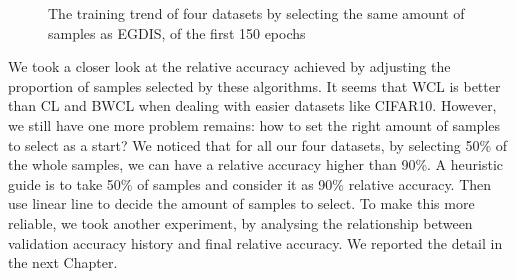 \begin{figure}[H]
\centering  
{}

\caption{The training trend of four datasets by selecting the same amount of samples as EGDIS, of the first 150 epochs}
\label{Fig.training_trend}
\end{figure}

We took a closer look at the relative accuracy achieved by adjusting the proportion of samples selected by these algorithms. It seems that WCL is better than CL and BWCL when dealing with easier datasets like CIFAR10. However, we still have one more problem remains: how to set the right amount of samples to select as a start? We noticed that for all our four datasets, by selecting 50\% of the whole samples, we can have a relative accuracy higher than 90\%. A heuristic guide is to take 50\% of samples and consider it as 90\% relative accuracy. Then use linear line to decide the amount of samples to select. To make this more reliable, we took another experiment, by analysing the relationship between validation accuracy history and final relative accuracy. We reported the detail in the next Chapter.

